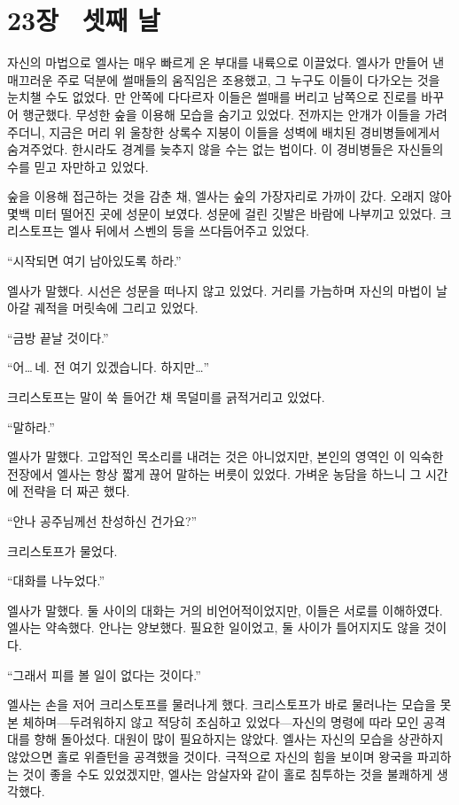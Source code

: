 \chapter[23장  셋째 날][23장\hspace*{.5em}셋째 날]{23장 \ 셋째 날}



자신의 마법으로 엘사는 매우 빠르게 온 부대를 내륙으로 이끌었다. 엘사가 만들어 낸 매끄러운 주로 덕분에 썰매들의 움직임은 조용했고, 그 누구도 이들이 다가오는 것을 눈치챌 수도 없었다. 만 안쪽에 다다르자 이들은 썰매를 버리고 남쪽으로 진로를 바꾸어 행군했다. 무성한 숲을 이용해 모습을 숨기고 있었다. 전까지는 안개가 이들을 가려주더니, 지금은 머리 위 울창한 상록수 지붕이 이들을 성벽에 배치된 경비병들에게서 숨겨주었다. 한시라도 경계를 늦추지 않을 수는 없는 법이다. 이 경비병들은 자신들의 수를 믿고 자만하고 있었다.

숲을 이용해 접근하는 것을 감춘 채, 엘사는 숲의 가장자리로 가까이 갔다. 오래지 않아 몇백 미터 떨어진 곳에 성문이 보였다. 성문에 걸린 깃발은 바람에 나부끼고 있었다. 크리스토프는 엘사 뒤에서 스벤의 등을 쓰다듬어주고 있었다.

``시작되면 여기 남아있도록 하라.''

엘사가 말했다. 시선은 성문을 떠나지 않고 있었다. 거리를 가늠하며 자신의 마법이 날아갈 궤적을 머릿속에 그리고 있었다.

``금방 끝날 것이다.''

``어\ldots\,네. 전 여기 있겠습니다. 하지만\ldots''

크리스토프는 말이 쑥 들어간 채 목덜미를 긁적거리고 있었다.

``말하라.''

엘사가 말했다. 고압적인 목소리를 내려는 것은 아니었지만, 본인의 영역인 이 익숙한 전장에서 엘사는 항상 짧게 끊어 말하는 버릇이 있었다. 가벼운 농담을 하느니 그 시간에 전략을 더 짜곤 했다.

``안나 공주님께선 찬성하신 건가요?''

크리스토프가 물었다.

``대화를 나누었다.''

엘사가 말했다. 둘 사이의 대화는 거의 비언어적이었지만, 이들은 서로를 이해하였다. 엘사는 약속했다. 안나는 양보했다. 필요한 일이었고, 둘 사이가 틀어지지도 않을 것이다.

``그래서 피를 볼 일이 없다는 것이다.''

엘사는 손을 저어 크리스토프를 물러나게 했다. 크리스토프가 바로 물러나는 모습을 못 본 체하며—두려워하지 않고 적당히 조심하고 있었다—자신의 명령에 따라 모인 공격대를 향해 돌아섰다. 대원이 많이 필요하지는 않았다. 엘사는 자신의 모습을 상관하지 않았으면 홀로 위즐턴을 공격했을 것이다. 극적으로 자신의 힘을 보이며 왕국을 파괴하는 것이 좋을 수도 있었겠지만, 엘사는 암살자와 같이 홀로 침투하는 것을 불쾌하게 생각했다.

